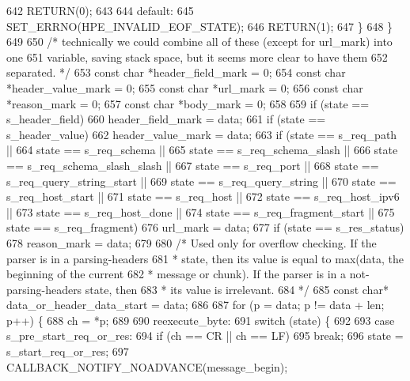 \begin{DoxyCode}
642         RETURN(0);
643 
644       \textcolor{keywordflow}{default}:
645         SET_ERRNO(HPE_INVALID_EOF_STATE);
646         RETURN(1);
647     \}
648   \}
649 
650   \textcolor{comment}{/* technically we could combine all of these (except for url\_mark) into one}
651 \textcolor{comment}{     variable, saving stack space, but it seems more clear to have them}
652 \textcolor{comment}{     separated. */}
653   \textcolor{keyword}{const} \textcolor{keywordtype}{char} *header\_field\_mark = 0;
654   \textcolor{keyword}{const} \textcolor{keywordtype}{char} *header\_value\_mark = 0;
655   \textcolor{keyword}{const} \textcolor{keywordtype}{char} *url\_mark = 0;
656   \textcolor{keyword}{const} \textcolor{keywordtype}{char} *reason\_mark = 0;
657   \textcolor{keyword}{const} \textcolor{keywordtype}{char} *body\_mark = 0;
658 
659   \textcolor{keywordflow}{if} (state == s_header_field)
660     header\_field\_mark = data;
661   \textcolor{keywordflow}{if} (state == s_header_value)
662     header\_value\_mark = data;
663   \textcolor{keywordflow}{if} (state == s_req_path ||
664       state == s_req_schema ||
665       state == s_req_schema_slash ||
666       state == s_req_schema_slash_slash ||
667       state == s_req_port ||
668       state == s_req_query_string_start ||
669       state == s_req_query_string ||
670       state == s_req_host_start ||
671       state == s_req_host ||
672       state == s_req_host_ipv6 ||
673       state == s_req_host_done ||
674       state == s_req_fragment_start ||
675       state == s_req_fragment)
676     url\_mark = data;
677   \textcolor{keywordflow}{if} (state == s_res_status)
678     reason\_mark = data;
679 
680   \textcolor{comment}{/* Used only for overflow checking. If the parser is in a parsing-headers}
681 \textcolor{comment}{   * state, then its value is equal to max(data, the beginning of the current}
682 \textcolor{comment}{   * message or chunk). If the parser is in a not-parsing-headers state, then}
683 \textcolor{comment}{   * its value is irrelevant.}
684 \textcolor{comment}{   */}
685   \textcolor{keyword}{const} \textcolor{keywordtype}{char}* data\_or\_header\_data\_start = data;
686 
687   \textcolor{keywordflow}{for} (p = data; p != data + len; p++) \{
688     ch = *p;
689 
690     reexecute\_byte:
691     \textcolor{keywordflow}{switch} (state) \{
692 
693       \textcolor{keywordflow}{case} s_pre_start_req_or_res:
694         \textcolor{keywordflow}{if} (ch == CR || ch == LF)
695           \textcolor{keywordflow}{break};
696         state = s_start_req_or_res;
697         CALLBACK_NOTIFY_NOADVANCE(message\_begin);

\end{DoxyCode}
